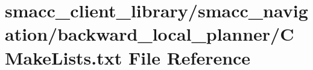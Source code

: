 \hypertarget{smacc__client__library_2smacc__navigation_2backward__local__planner_2CMakeLists_8txt}{}\section{smacc\+\_\+client\+\_\+library/smacc\+\_\+navigation/backward\+\_\+local\+\_\+planner/\+C\+Make\+Lists.txt File Reference}
\label{smacc__client__library_2smacc__navigation_2backward__local__planner_2CMakeLists_8txt}
